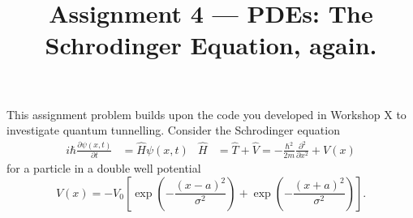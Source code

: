 \documentclass[11pt]{article}
\title{Assignment 4 --- PDEs: The Schrodinger Equation, again. }
\date{}                                           %
\begin{document}
\maketitle
\vspace{-36pt}
This assignment problem builds upon the code you developed in Workshop X  to investigate quantum tunnelling. Consider  the Schrodinger equation
\begin{align}
i \hbar \frac{\partial \psi (x,t)}{\partial t}  &= \hat H  \psi(x,t) & \hat H &= \hat T + \hat V  =   -\tfrac{\hbar^2 }{2m} \tfrac{
\partial^2}{\partial x^2} + V(x)
\end{align}
 for a particle in a double well potential  
\begin{equation}
V(x) = -V_0 \left[ \exp\left( -\frac{(x-a)^2}{\sigma^2} \right) + \exp\left( -\frac{(x+a)^2}{\sigma^2} \right) \right].
\end{equation}
\dotfill \\
\end{document}
